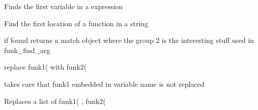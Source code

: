 \documentclass[letterpaper,10pt,english]{sphinxmanual}
\begin{document}

\begin{fulllineitems}
\label{\detokenize{onboard/modelnormalize:modelnormalize.endovar}}
\pysigstartsignatures
{}
\pysigstopsignatures
\sphinxAtStartPar
Finds the first variable in a expression

\end{fulllineitems}


\begin{fulllineitems}
\label{\detokenize{onboard/modelnormalize:modelnormalize.funk_in}}
\pysigstartsignatures
{}
\pysigstopsignatures
\sphinxAtStartPar
Find the first location of a function in a string

\sphinxAtStartPar
if found returns a match object where the group 2 is the interesting stuff used in funk\_find\_arg

\end{fulllineitems}


\begin{fulllineitems}
\label{\detokenize{onboard/modelnormalize:modelnormalize.funk_replace}}
\pysigstartsignatures
{}
\pysigstopsignatures
\sphinxAtStartPar
replace funk1( with funk2(

\sphinxAtStartPar
takes care that funk1 embedded in variable name is not replaced

\end{fulllineitems}


\begin{fulllineitems}
\label{\detokenize{onboard/modelnormalize:modelnormalize.funk_replace_list}}
\pysigstartsignatures
{}
\pysigstopsignatures
\sphinxAtStartPar
Replaces a list of funk1( , funk2(

\end{fulllineitems}
\end{document}
